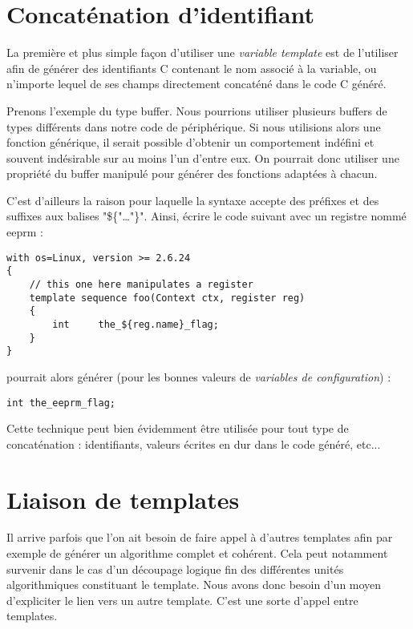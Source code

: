 \documentclass[french]{rtxreport}
\begin{document}
\section{Concaténation d'identifiant}

La première et plus simple façon d'utiliser une \emph{variable template} est de
l'utiliser afin de générer des identifiants C contenant le nom associé à la
variable, ou n'importe lequel de ses champs directement concaténé dans le code
C généré.

Prenons l'exemple du type buffer. Nous pourrions utiliser plusieurs buffers de
types différents dans notre code de périphérique. Si nous utilisions alors une
fonction générique, il serait possible d'obtenir un comportement indéfini et
souvent indésirable sur au moins l'un d'entre eux. On pourrait donc utiliser
une propriété du buffer manipulé pour générer des fonctions adaptées à chacun.

C'est d'ailleurs la raison pour laquelle la syntaxe accepte des préfixes et des
suffixes aux balises "\$\{"\ldots"\}". Ainsi, écrire le code suivant avec un
registre nommé eeprm :
\begin{lstlisting}
with os=Linux, version >= 2.6.24
{
    // this one here manipulates a register
    template sequence foo(Context ctx, register reg)
    {
        int     the_${reg.name}_flag;
    }
}
\end{lstlisting}

pourrait alors générer (pour les bonnes valeurs de \emph{variables de
configuration}) :
\lstset{language=C}
\begin{lstlisting}
int the_eeprm_flag;
\end{lstlisting}

Cette technique peut bien évidemment être utilisée pour tout type de
concaténation : identifiants, valeurs écrites en dur dans le code généré, etc...

\section{Liaison de templates}

Il arrive parfois que l'on ait besoin de faire appel à d'autres templates afin
par exemple de générer un algorithme complet et cohérent. Cela peut notamment
survenir dans le cas d'un découpage logique fin des différentes unités
algorithmiques constituant le template. Nous avons donc besoin d'un moyen
d'expliciter le lien vers un autre template. C'est une sorte d'appel entre
templates.
\end{document}
